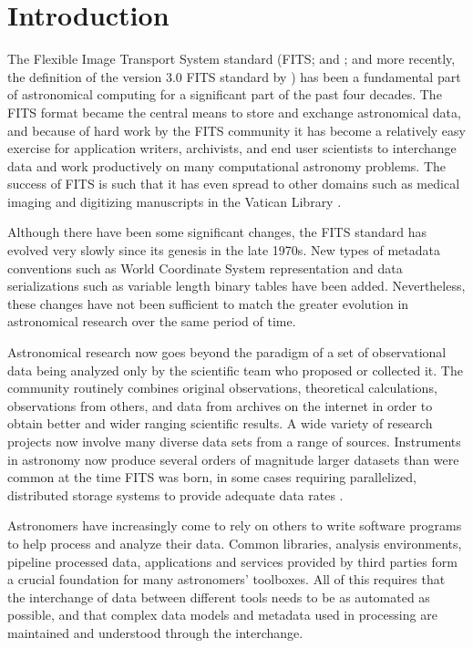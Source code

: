 \documentclass[final,authoryear,5p,times,twocolumn]{elsarticle}
\begin{document}
\section{Introduction}


The Flexible Image Transport System standard (FITS;
\citealt{1979ipia.coll..445W,1980SPIE..264..298G,1981A&AS...44..363W,1981A&AS...44..371G} and
\citealt{2001A&A...376..359H}; and more recently, the definition of the
version 3.0 FITS standard by \citealt{2010A&A...524A..42P}) has been a
fundamental part of astronomical computing for a significant part of the
past four decades. The FITS format became the central means to store and
exchange astronomical data, and because of hard work by the FITS
community it has become a relatively easy exercise for application
writers, archivists, and end user scientists to interchange data and
work productively on many computational astronomy problems. The success
of FITS is such that it has even spread to other domains such as medical
imaging and digitizing manuscripts in the Vatican Library
\citep{2006JRASC.100..242W,2012EWASSAlle}.


Although there have been some significant changes, the FITS standard
has evolved very slowly since its genesis in the late 1970s. New types
of metadata conventions such as World Coordinate System
\citep[WCS;][]{2002A&A...395.1061G,2002A&A...395.1077C,2006A&A...446..747G}
representation and data serializations such as variable length binary
tables \citep{1995A&AS..113..159C} have been added. Nevertheless,
these changes have not been sufficient to match the greater evolution
in astronomical research over the same period of time.


Astronomical research now goes beyond the paradigm of a set of
observational data being analyzed only by the scientific team who
proposed or collected it. The community routinely combines original
observations, theoretical calculations, observations from others, and
data from archives on the internet in order to obtain better and wider
ranging scientific results. A wide variety of research projects now involve many
diverse data sets from a range of sources. Instruments in astronomy
now produce several orders of magnitude larger datasets than were common
at the time FITS was born, in some cases requiring parallelized,
distributed storage systems to provide adequate data rates
\citep{2012ASPC..461..283A}.


Astronomers have increasingly come to rely on others to write software
programs
to help process and analyze their data. Common libraries, analysis
environments, pipeline processed data, applications and services
provided by third parties form a crucial foundation for many
astronomers' toolboxes. All of this requires that the interchange of
data between different tools needs to be as automated as possible, and
that complex data models and metadata used in processing are
maintained and understood through the interchange.
\end{document}
